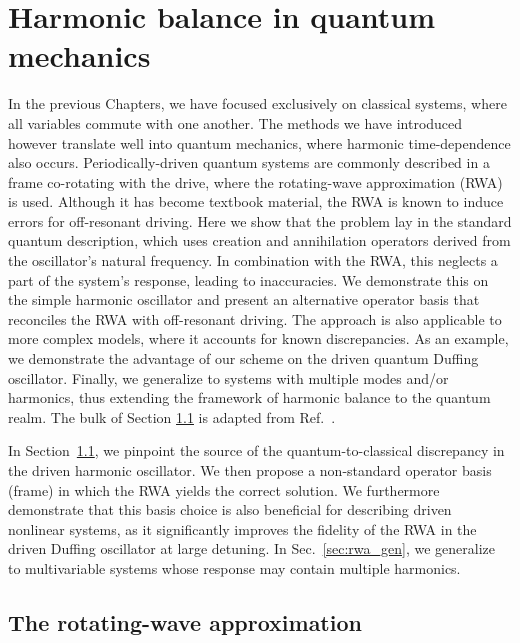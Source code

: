 
\chapter{Harmonic balance in quantum mechanics} \label{ch:rwa}

\begin{chapterabstract}
	In the previous Chapters, we have focused exclusively on classical systems, where all variables commute with one another. The methods we have introduced however translate well into quantum mechanics, where harmonic time-dependence also occurs. Periodically-driven quantum systems are commonly described in a frame co-rotating with the drive, where the rotating-wave approximation (RWA) is used. Although it has become textbook material, the RWA is known to induce errors for off-resonant driving. Here we show that the problem lay in the standard quantum description, which uses creation and annihilation operators derived from the oscillator’s natural frequency. In combination with the RWA, this neglects a part of the system's response, leading to inaccuracies. We demonstrate this on the simple harmonic oscillator and present an alternative operator basis that reconciles the RWA with off-resonant driving. The approach is also applicable to more complex models, where it accounts for known discrepancies. As an example, we demonstrate the advantage of our scheme on the driven quantum Duffing oscillator. Finally, we generalize to systems with multiple modes and/or harmonics, thus extending the framework of harmonic balance to the quantum realm.
	\tcblower
	The bulk of Section \ref{sec:rwa_rwa} is adapted from Ref.~\cite{Kosata_2022b}.
\end{chapterabstract}

In Section~\ref{sec:rwa_rwa}, we pinpoint the source of the quantum-to-classical discrepancy in the driven harmonic oscillator. We then propose a non-standard operator basis (frame) in which the RWA yields the correct solution. We furthermore demonstrate that this basis choice is also beneficial for describing driven nonlinear systems, as it significantly improves the fidelity of the RWA in the driven Duffing oscillator at large detuning. In Sec.~\ref{sec:rwa_gen}, we generalize to multivariable systems whose response may contain multiple harmonics.

\section{The rotating-wave approximation} \label{sec:rwa_rwa}

